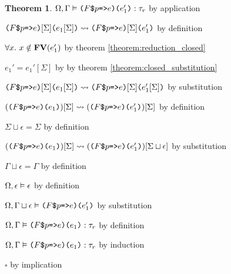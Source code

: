 \documentclass[acmsmall]{acmart}
\theoremstyle{definition}
\newtheorem{theorem}{Theorem}[section]
\begin{document}
\begin{theorem}
      \item \Z\Z $\Omega, \Gamma \vDash \texttt{($F$\$$p$=>$e$)($e_1'$)} : \tau_r$ by application
      \item \Z\Z $\texttt{($F$\$$p$=>$e$)$[\Sigma]$($e_1[\Sigma]$)} \rightsquigarrow \texttt{($F$\$$p$=>$e$)$[\Sigma]$($e_1'$)}$ by definition 
      \item \Z\Z $\forall x .\ x \notin \textbf{FV}(e_1')$ by theorem \ref{theorem:reduction_closed} 
      \item \Z\Z $e_1' = e_1'[\Sigma]$ by by theorem \ref{theorem:closed_substitution} 
      \item \Z\Z $\texttt{($F$\$$p$=>$e$)$[\Sigma]$($e_1[\Sigma]$)} \rightsquigarrow \texttt{($F$\$$p$=>$e$)$[\Sigma]$($e_1'[\Sigma]$)}$ by substitution 
      \item \Z\Z $(\texttt{($F$\$$p$=>$e$)($e_1$)})[\Sigma] \rightsquigarrow (\texttt{($F$\$$p$=>$e$)($e_1'$)})[\Sigma]$ by definition 
      \item \Z\Z $\Sigma \sqcup \epsilon = \Sigma$ by definition 
      \item \Z\Z $(\texttt{($F$\$$p$=>$e$)($e_1$)})[\Sigma] \rightsquigarrow (\texttt{($F$\$$p$=>$e$)($e_1'$)})[\Sigma \sqcup \epsilon]$ by substitution 
      \item \Z\Z $\Gamma \sqcup \epsilon = \Gamma$ by definition
      \item \Z\Z $\Omega, \epsilon \vDash \epsilon$ by definition
      \item \Z\Z $\Omega, \Gamma \sqcup \epsilon \vDash \texttt{($F$\$$p$=>$e$)($e_1'$)}$ by substitution 
      \item \Z\Z $\Omega, \Gamma \vDash \texttt{($F$\$$p$=>$e$)}\texttt{(}e_1\texttt{)} : \tau_r$ by definition
    \item \Z $\Omega, \Gamma \vDash \texttt{($F$\$$p$=>$e$)}\texttt{(}e_1\texttt{)} : \tau_r$ by induction
  \item $\square$ by implication 
\end{theorem}
\end{document}
